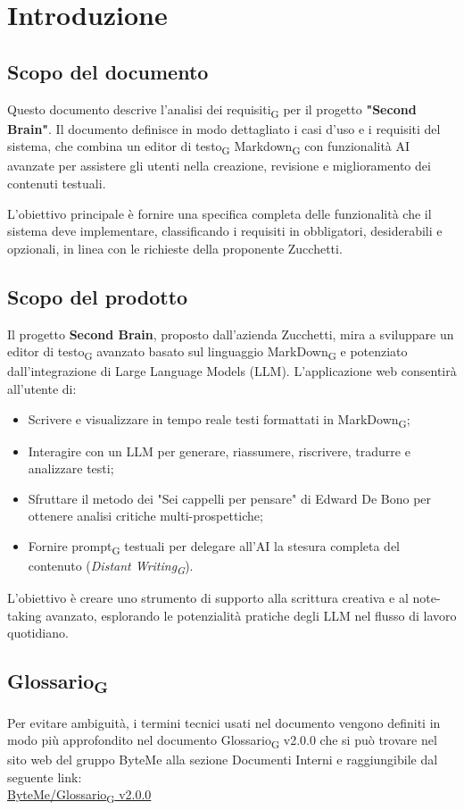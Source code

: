 \documentclass[11pt,a4paper]{article}
\newcommand{\gls}[1]{#1\textsubscript{G}}
\begin{document}
\section{Introduzione}
\subsection{Scopo del documento}
Questo documento descrive l'\gls{analisi dei requisiti} per il progetto \textbf{"Second Brain"}. Il documento definisce in modo dettagliato i casi d'uso e i requisiti del sistema, che combina un \gls{editor di testo} \gls{Markdown} con funzionalità AI avanzate per assistere gli utenti nella creazione, revisione e miglioramento dei contenuti testuali.

L'obiettivo principale è fornire una specifica completa delle funzionalità che il sistema deve implementare, classificando i requisiti in obbligatori, desiderabili e opzionali, in linea con le richieste della proponente Zucchetti.

\subsection{Scopo del prodotto}
Il progetto \textbf{Second Brain}, proposto dall'azienda Zucchetti, mira a sviluppare un \gls{editor di testo} avanzato basato sul linguaggio \gls{MarkDown} e potenziato dall'integrazione di Large Language Models (LLM).
L'applicazione web consentirà all'utente di:
\begin{itemize}
    \item Scrivere e visualizzare in tempo reale testi formattati in \gls{MarkDown};
    \item Interagire con un LLM per generare, riassumere, riscrivere, tradurre e analizzare testi;
    \item Sfruttare il metodo dei "Sei cappelli per pensare" di Edward De Bono per ottenere analisi critiche multi-prospettiche;
    \item Fornire \gls{prompt} testuali per delegare all'AI la stesura completa del contenuto (\textit{\gls{Distant Writing}}).
\end{itemize}
L'obiettivo è creare uno strumento di supporto alla scrittura creativa e al note-taking avanzato, esplorando le potenzialità pratiche degli LLM nel flusso di lavoro quotidiano.

\subsection{\gls{Glossario}}
Per evitare ambiguità, i termini tecnici usati nel documento vengono definiti in modo più approfondito nel documento \gls{Glossario} v2.0.0 che si può trovare nel sito web del gruppo ByteMe alla sezione Documenti Interni e raggiungibile dal seguente link:\\
\href{https://byteme25.github.io/ByteMe/files.html}{ByteMe/\gls{Glossario} v2.0.0}
\end{document}
